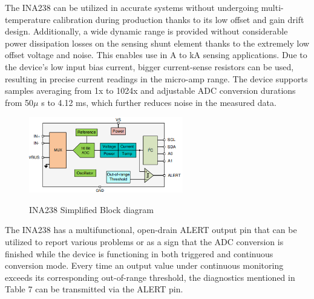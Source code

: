The INA238 can be utilized in accurate systems without undergoing multi-temperature calibration during production thanks to its low offset and gain drift design. Additionally, a wide dynamic range is provided without considerable power dissipation losses on the sensing shunt element thanks to the extremely low offset voltage and noise. This enables use in A to kA sensing applications. Due to the device's low input bias current, bigger current-sense resistors can be used, resulting in precise current readings in the micro-amp range.
The device supports samples averaging from 1x to 1024x and adjustable ADC conversion durations from 50$\mu$ s to 4.12 ms, which further reduces noise in the measured data.

\begin{figure}[h]
	\centering
	\includegraphics[width=0.6\textwidth]{Chap05/Figures/INA238_Simplified_Block_diagram.PNG}
	\label{fig:INA238_Simplified_Block_diagram}
	\caption{INA238 Simplified Block diagram \cite{INA238_User_Datasheet}}
\end{figure}

The INA238 has a multifunctional, open-drain ALERT output pin that can be utilized to report various problems or as a sign that the ADC conversion is finished while the device is functioning in both triggered and continuous conversion mode. Every time an output value under continuous monitoring exceeds its corresponding out-of-range threshold, the diagnostics mentioned in Table 7 can be transmitted via the ALERT pin.


